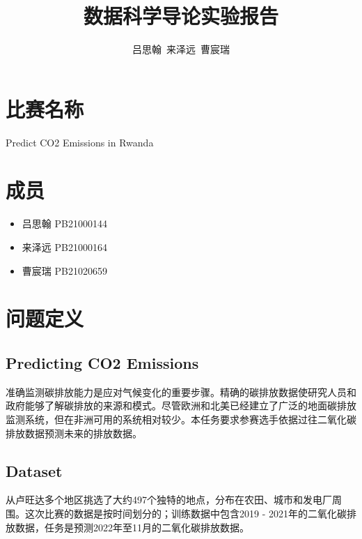 \documentclass[fontset=windows]{article}
\title{\textbf{数据科学导论实验报告}}
\author{吕思翰\ 来泽远\ 曹宸瑞}
\begin{document}
\renewcommand{\figurename}{图}
\maketitle




\section{比赛名称}

Predict CO2 Emissions in Rwanda

\section{成员}

\begin{itemize}
      \item 吕思翰 PB21000144
      \item 来泽远 PB21000164
      \item 曹宸瑞 PB21020659
\end{itemize}

\section{问题定义}

\subsection{Predicting CO2 Emissions}

准确监测碳排放能力是应对气候变化的重要步骤。精确的碳排放数据使研究人员和政府能够了解碳排放的来源和模式。尽管欧洲和北美已经建立了广泛的地面碳排放监测系统，但在非洲可用的系统相对较少。本任务要求参赛选手依据过往二氧化碳排放数据预测未来的排放数据。

\subsection{Dataset}

从卢旺达多个地区挑选了大约497个独特的地点，分布在农田、城市和发电厂周围。这次比赛的数据是按时间划分的；训练数据中包含2019 - 2021年的二氧化碳排放数据，任务是预测2022年至11月的二氧化碳排放数据。
\end{document}
